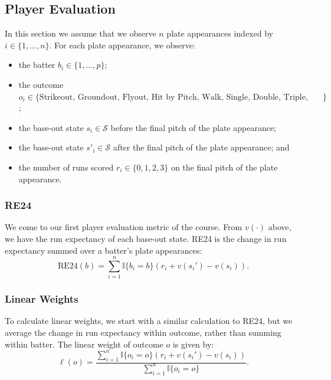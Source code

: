 \documentclass{article}
\begin{document}
    \subsection{\sc Player Evaluation}

      In this section we assume that we observe $n$ plate appearances indexed by $i \in \{1, ..., n\}$. For each plate appearance, we observe:
      \begin{itemize}
        \item the batter $b_i \in \{1, ..., p\}$;
        \item the outcome $o_i \in \{\mbox{Strikeout, Groundout, Flyout, Hit by Pitch, Walk, Single, Double, Triple, Home Run}\}$;
        \item the base-out state $s_i \in \mathcal{S}$ before the final pitch of the plate appearance;
        \item the base-out state $s'_i \in \mathcal{S}$ after the final pitch of the plate appearance; and
        \item the number of runs scored $r_i \in \{0, 1, 2, 3\}$ on the final pitch of the plate appearance.
      \end{itemize}

      \subsubsection{\sc RE24}

        We come to our first player evaluation metric of the course. From $v(\cdot)$ above, we have the run expectancy of each base-out state. RE24 is the change in run expectancy summed over a batter's plate appearances:
        \begin{equation*}
          \text{RE24}(b) = \sum_{i = 1}^n \mathbb{I}\{b_i = b\} (r_i + v(s_i') - v(s_i)).
        \end{equation*}

      \subsubsection{\sc Linear Weights}

        To calculate linear weights, we start with a similar calculation to RE24, but we average the change in run expectancy within outcome, rather than summing within batter. The linear weight of outcome $o$ is given by:
        \begin{equation*}
          \ell(o) = \frac{
            \sum_{i = 1}^n \mathbb{I}\{o_i = o\} (r_i + v(s_i') - v(s_i))
          }{
            \sum_{i = 1}^n \mathbb{I}\{o_i = o\}
          }.
        \end{equation*}
\end{document}
